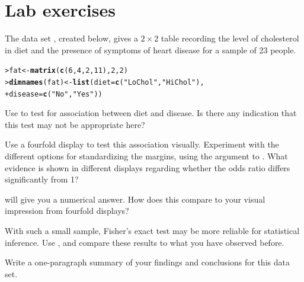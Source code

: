 \documentclass[10pt,krantz2]{krantz}\usepackage[]{graphicx}\usepackage[]{color}
\makeatletter
\newcommand{\hlnum}[1]{\textcolor[rgb]{0.686,0.059,0.569}{#1}}%
\newcommand{\hlstr}[1]{\textcolor[rgb]{0.192,0.494,0.8}{#1}}%
\newcommand{\hlstd}[1]{\textcolor[rgb]{0.345,0.345,0.345}{#1}}%
\newcommand{\hlkwb}[1]{\textcolor[rgb]{0.69,0.353,0.396}{#1}}%
\newcommand{\hlkwc}[1]{\textcolor[rgb]{0.333,0.667,0.333}{#1}}%
\newcommand{\hlkwd}[1]{\textcolor[rgb]{0.737,0.353,0.396}{\textbf{#1}}}%
\newenvironment{kframe}{%
 \def\at@end@of@kframe{}%
 \ifinner\ifhmode%
  \def\at@end@of@kframe{\end{minipage}}%
  \begin{minipage}{\columnwidth}%
 \fi\fi%
 \def\FrameCommand##1{\hskip\@totalleftmargin \hskip-\fboxsep
 \colorbox{shadecolor}{##1}\hskip-\fboxsep
     \hskip-\linewidth \hskip-\@totalleftmargin \hskip\columnwidth}%
 \MakeFramed {\advance\hsize-\width
   \@totalleftmargin\z@ \linewidth\hsize
   \@setminipage}}%
 {\par\unskip\endMakeFramed%
 \at@end@of@kframe}
\newenvironment{knitrout}{}{} %
\renewenvironment{knitrout}{\small\renewcommand{\baselinestretch}{.85}}{} %
\makeatother
\begin{document}

\section{Lab exercises}\label{sec:twoway-lab}


\begin{Exercises}

  \exercise The data set , created below, gives a $2 \times 2$ table recording the level of
  cholesterol in diet and the presence of symptoms of heart disease for a sample of
  23 people.

\begin{knitrout}
\color{fgcolor}\begin{kframe}
\begin{alltt}
\hlstd{> }\hlstd{fat} \hlkwb{<-} \hlkwd{matrix}\hlstd{(}\hlkwd{c}\hlstd{(}\hlnum{6}\hlstd{,} \hlnum{4}\hlstd{,} \hlnum{2}\hlstd{,} \hlnum{11}\hlstd{),} \hlnum{2}\hlstd{,} \hlnum{2}\hlstd{)}
\hlstd{> }\hlkwd{dimnames}\hlstd{(fat)} \hlkwb{<-} \hlkwd{list}\hlstd{(}\hlkwc{diet} \hlstd{=} \hlkwd{c}\hlstd{(}\hlstr{"LoChol"}\hlstd{,} \hlstr{"HiChol"}\hlstd{),}
\hlstd{+ }                      \hlkwc{disease} \hlstd{=} \hlkwd{c}\hlstd{(}\hlstr{"No"}\hlstd{,} \hlstr{"Yes"}\hlstd{))}
\end{alltt}
\end{kframe}
\end{knitrout}

  \begin{enumerate*}
    \item Use  to test for association between diet and disease.
    Is there any indication that this test may not be appropriate here?
    \item Use a fourfold display to test this association visually.  Experiment with
    the different options for standardizing the margins, using the 
    argument to . What evidence is shown in different displays regarding
    whether the odds ratio differs significantly from 1?
    \item {} will give you a numerical answer.  How does
    this compare to your visual impression from fourfold displays?
    \item With such a small sample, Fisher's exact test may be more reliable for statistical
    inference.  Use , and compare these results to what you have
    observed before.
    \item Write a one-paragraph summary of your findings and conclusions for this data set.
  \end{enumerate*}


\end{Exercises}
\end{document}
